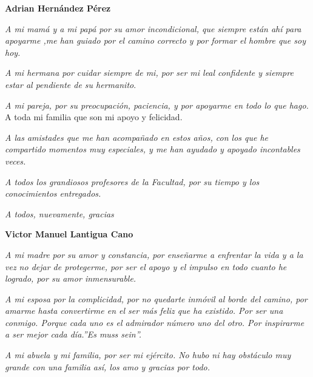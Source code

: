 \begin{acknowledgements}
	
	\begin{flushleft}
	\textbf{ {\LARGE Adrian Hernández Pérez}}
	\newline

	{\large 	\emph{A mi mamá y a mi papá por su amor incondicional, que siempre están ahí para apoyarme ,me han guiado por el camino correcto y por formar el hombre que soy hoy.}
		\newline
		
	\emph{	A mi hermana por cuidar siempre de mi, por ser mi leal confidente y siempre estar al pendiente de su hermanito}.
		\newline
		
	\emph{	A mi pareja, por su preocupación, paciencia, y por apoyarme en todo lo que hago. }
		\newline
		A toda mi familia que son mi apoyo y felicidad.
		\newline
		
	\emph{	A las amistades que me han acompañado en estos años, con los que he compartido momentos muy especiales, y me han ayudado y apoyado incontables veces.}
		\newline
		
	\emph{	A todos los grandiosos  profesores de la Facultad, por su tiempo y los conocimientos entregados.}
		\newline
		
		\emph{A todos, nuevamente, gracias}}
	
	\newpage

	\textbf{ {\LARGE Victor Manuel Lantigua Cano}}
		\newline
	
		{\large
		\emph{	A mi madre por su amor y constancia, por enseñarme a enfrentar la vida y a la vez no dejar de protegerme, por ser el apoyo y el impulso en todo cuanto he logrado, por su amor inmensurable.}
			\newline
			
		\emph{	A mi esposa por la complicidad, por no quedarte inmóvil al borde del camino, por amarme hasta convertirme en el ser más feliz que ha existido. Por ser una conmigo. Porque cada uno es el admirador número uno del otro. Por inspirarme a ser mejor cada día.\linebreak''Es muss sein''.}
			\newline
	
		\emph{	A mi abuela y mi familia, por ser mi ejército. No hubo ni hay obstáculo muy grande con una familia así, los amo y gracias por todo. }
			\newline
			
}
\end{flushleft}
\end{acknowledgements}
